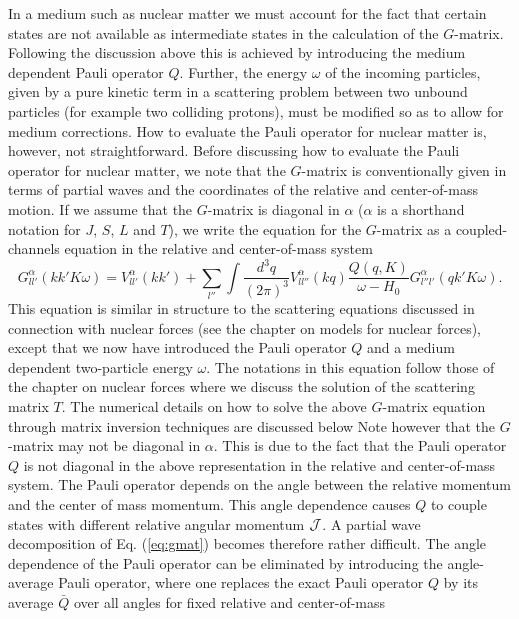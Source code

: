 \documentclass[%
oneside,                 %
final,                   %
10pt]{article}
\begin{document}
In a medium such as nuclear 
matter we must account
for the fact that certain states are not available as intermediate
states in the calculation of the $G$-matrix.
Following the discussion above
this is achieved by introducing the medium
dependent Pauli operator $Q$. Further, the
energy $\omega$ of the incoming particles, given by a pure kinetic
term in a scattering problem between two unbound particles (for example two colliding protons), must be modified so as to allow
for medium corrections.
How to evaluate the Pauli operator for
nuclear matter is, however, not straightforward.
Before discussing how to evaluate the Pauli operator for nuclear matter,
we note that the $G$-matrix
is conventionally given in terms of partial waves and
the coordinates of the relative and center-of-mass motion.
If we assume that the $G$-matrix is diagonal in $\alpha$ ($\alpha$ is a shorthand
notation for $J$, $S$, $L$ and $T$), we  write the equation for the $G$-matrix as a 
coupled-channels equation in the relative and center-of-mass system
\begin{equation}
   G_{ll'}^{\alpha}(kk'K\omega )=V_{ll'}^{\alpha}(kk')
   +\sum_{l''}\int \frac{d^3 q}{(2\pi )^3}V_{ll''}^{\alpha}(kq)
   \frac{Q(q,K)}{\omega -H_0}
   G_{l''l'}^{\alpha}(qk'K\omega).
   \label{eq:gnonrel}
\end{equation}
This equation is similar in structure to the scattering
equations discussed in connection with nuclear forces (see the chapter on models for nuclear forces), except that we now have
introduced the Pauli operator $Q$ and a medium dependent two-particle
energy $\omega$. The notations in this equation follow those of the chapter on nuclear forces
where we discuss the solution of the scattering
matrix $T$.
The numerical details on how to solve the above $G$-matrix
equation through matrix inversion techniques are discussed below
Note however that the $G$-matrix may not be diagonal in $\alpha$.
This is due to the fact that the
Pauli operator $Q$ is not diagonal
in the above representation in the relative and center-of-mass
system. The Pauli operator depends on the
angle between the relative momentum and the center of mass momentum.
This angle dependence causes $Q$ to couple states with different
relative angular
momentum ${\cal J}$. A partial wave decomposition of Eq. (\ref{eq:gmat})
becomes therefore rather difficult.
The angle dependence of the Pauli operator
can be eliminated by introducing the angle-average
Pauli operator, where one replaces the exact Pauli operator $Q$
by its average $\bar{Q}$ over all angles for fixed relative and center-of-mass
\end{document}
